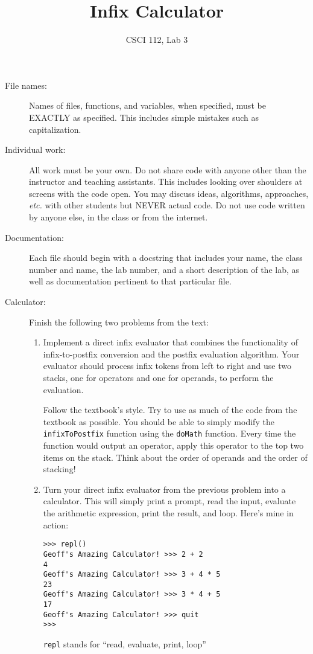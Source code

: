 \documentclass{article}
\title{Infix Calculator}
\author{CSCI 112, Lab 3}
\date{}
\begin{document}
\sloppy

\maketitle

\begin{description} 
\item[File names:]  Names of files, functions, and variables, 
when specified,
must be EXACTLY as specified.  This includes simple mistakes such
as capitalization.

\item[Individual work:]  All work must be your own.  Do not share
code with anyone other than the instructor and teaching assistants.
This includes looking over shoulders at screens with the code open.
You may discuss ideas, algorithms, approaches, {\em etc.} with
other students but NEVER actual code.  Do not use code
written by anyone else, in the class or from the internet.

\item[Documentation:] Each file should begin with a docstring
that includes your name, the class number and name, the lab
number, and  
a short description of the lab, as well as documentation pertinent
to that particular file.

\item[Calculator:] Finish the following two problems from the text:
\begin{enumerate}
\item
Implement a direct infix evaluator that combines the functionality of infix-to-postfix conversion and the postfix evaluation algorithm. Your evaluator should process infix tokens from left to right and use two stacks, one for operators and one for operands, to perform the evaluation.

Follow the textbook's style.  Try to use as much of the code from the textbook
as possible.  You should be able to simply modify the \lstinline{infixToPostfix}
function using the \lstinline{doMath} function.  Every time the function would
output an operator, apply this operator to the top two items on the stack.
Think about the order of operands and the order of stacking!
\item
Turn your direct infix evaluator from the previous problem into a calculator.
This will simply print a prompt, read the input, evaluate the arithmetic 
expression, print the result, and loop.  Here's mine in action:
\begin{Verbatim}[frame=single]
>>> repl()
Geoff's Amazing Calculator! >>> 2 + 2
4
Geoff's Amazing Calculator! >>> 3 + 4 * 5
23
Geoff's Amazing Calculator! >>> 3 * 4 + 5
17
Geoff's Amazing Calculator! >>> quit
>>> 
\end{Verbatim}
{\tt repl} stands for ``read, evaluate, print, loop''


\end{enumerate}
\end{description}
\end{document}
